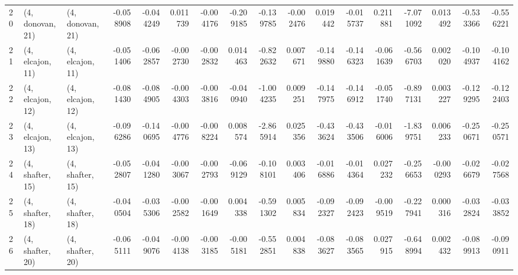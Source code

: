 \begin{tabular}{lllrrrrrrrrrrrrrr}
20 &  (4, donovan, 21) &  (4, donovan, 21) & -0.058908 & -0.044249 &   0.011739 & -0.004176 & -0.209185 &  -0.139785 & -0.002476 &   0.019442 & -0.015737 &  0.211881 &  -7.071092 &  0.013492 & -0.533366 & -0.556221 \\
21 &  (4, elcajon, 11) &  (4, elcajon, 11) & -0.051406 & -0.062857 &  -0.002730 & -0.002832 &  0.014463 &  -0.822632 &  0.007671 &  -0.149880 & -0.146323 & -0.061639 &  -0.566703 &  0.002020 & -0.104937 & -0.104162 \\
22 &  (4, elcajon, 12) &  (4, elcajon, 12) & -0.081430 & -0.084905 &  -0.004303 & -0.003816 & -0.040940 &  -1.004235 &  0.009251 &  -0.147975 & -0.146912 & -0.051740 &  -0.897131 &  0.003227 & -0.129295 & -0.122403 \\
23 &  (4, elcajon, 13) &  (4, elcajon, 13) & -0.096286 & -0.140695 &  -0.004776 & -0.008224 &  0.008574 &  -2.865914 &  0.025356 &  -0.433624 & -0.433506 & -0.016006 &  -1.839751 &  0.006233 & -0.250671 & -0.250571 \\
24 &  (4, shafter, 15) &  (4, shafter, 15) & -0.052807 & -0.041280 &  -0.003067 & -0.002793 & -0.069129 &  -0.108101 &  0.003406 &  -0.016886 & -0.014364 &  0.027232 &  -0.256653 & -0.000293 & -0.026679 & -0.027568 \\
25 &  (4, shafter, 18) &  (4, shafter, 18) & -0.040504 & -0.035306 &  -0.002582 & -0.001649 &  0.004338 &  -0.591302 &  0.005834 &  -0.092327 & -0.092423 & -0.009519 &  -0.227941 &  0.000316 & -0.032824 & -0.033852 \\
26 &  (4, shafter, 20) &  (4, shafter, 20) & -0.065111 & -0.049076 &  -0.004138 & -0.003185 & -0.005181 &  -0.552851 &  0.004838 &  -0.083627 & -0.083565 &  0.027915 &  -0.648994 &  0.002432 & -0.089913 & -0.090911 \\
\bottomrule
\end{tabular}
